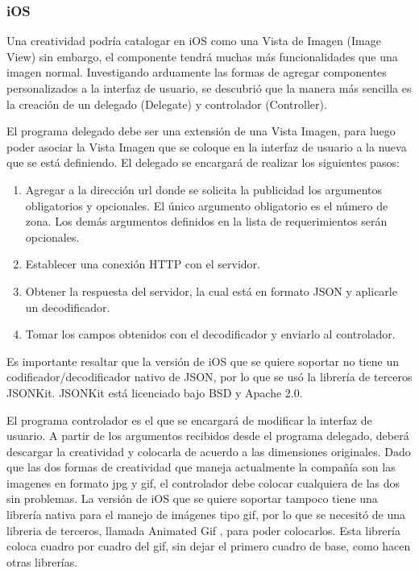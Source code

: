 \subsubsection*{iOS}

Una creatividad podría catalogar en iOS como una Vista de Imagen (Image
View) sin embargo, el componente tendrá muchas más funcionalidades
que una imagen normal. Investigando arduamente las formas de agregar
componentes personalizados a la interfaz de usuario, se descubrió
que la manera más sencilla es la creación de un delegado (Delegate)
y controlador (Controller). 

El programa delegado debe ser una extensión de una Vista Imagen, para
luego poder asociar la Vista Imagen que se coloque en la interfaz
de usuario a la nueva que se está definiendo. El delegado se encargará
de realizar los siguientes pasos:
\begin{enumerate}
\item Agregar a la dirección url donde se solicita la publicidad los argumentos
obligatorios y opcionales. El único argumento obligatorio es el número
de zona. Los demás argumentos definidos en la lista de requerimientos
serán opcionales.
\item Establecer una conexión HTTP con el servidor.
\item Obtener la respuesta del servidor, la cual está en formato JSON y
aplicarle un decodificador.
\item Tomar los campos obtenidos con el decodificador y enviarlo al controlador.
\end{enumerate}
Es importante resaltar que la versión de iOS que se quiere soportar
no tiene un codificador/decodificador nativo de JSON, por lo que se
usó la librería de terceros JSONKit. JSONKit está licenciado bajo
BSD y Apache 2.0.\cite{Cap5.JSONKit}

El programa controlador es el que se encargará de modificar la interfaz
de usuario. A partir de los argumentos recibidos desde el programa
delegado, deberá descargar la creatividad y colocarla de acuerdo a
las dimensiones originales. Dado que las dos formas de creatividad
que maneja actualmente la compañía son las imagenes en formato jpg
y gif, el controlador debe colocar cualquiera de las dos sin problemas.
La versión de iOS que se quiere soportar tampoco tiene una librería
nativa para el manejo de imágenes tipo gif, por lo que se necesitó
de una libreria de terceros, llamada Animated Gif \cite{Cap5.AnimatedGif},
para poder colocarlos. Esta librería coloca cuadro por cuadro del
gif, sin dejar el primero cuadro de base, como hacen otras librerías. 


